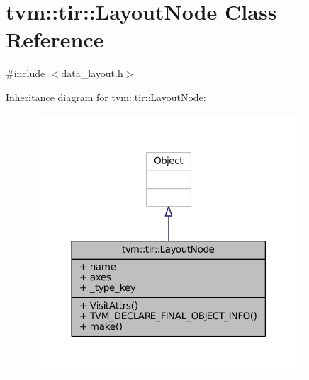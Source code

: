 \hypertarget{classtvm_1_1tir_1_1LayoutNode}{}\section{tvm\+:\+:tir\+:\+:Layout\+Node Class Reference}
\label{classtvm_1_1tir_1_1LayoutNode}


{\ttfamily \#include $<$data\+\_\+layout.\+h$>$}



Inheritance diagram for tvm\+:\+:tir\+:\+:Layout\+Node\+:
\nopagebreak
\begin{figure}[H]
\begin{center}
\leavevmode
\includegraphics[width=285pt]{classtvm_1_1tir_1_1LayoutNode__inherit__graph}
\end{center}
\end{figure}


